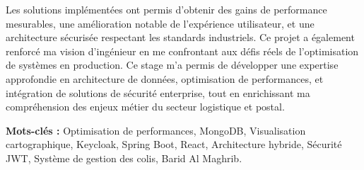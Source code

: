 Les solutions implémentées ont permis d'obtenir des gains de performance mesurables, une amélioration notable de l'expérience utilisateur, et une architecture sécurisée respectant les standards industriels. Ce projet a également renforcé ma vision d'ingénieur en me confrontant aux défis réels de l'optimisation de systèmes en production. Ce stage m'a permis de développer une expertise approfondie en architecture de données, optimisation de performances, et intégration de solutions de sécurité enterprise, tout en enrichissant ma compréhension des enjeux métier du secteur logistique et postal.

\vspace{1cm}
\noindent\textbf{Mots-clés :} Optimisation de performances, MongoDB, Visualisation cartographique, Keycloak, Spring Boot, React, Architecture hybride, Sécurité JWT, Système de gestion des colis, Barid Al Maghrib.